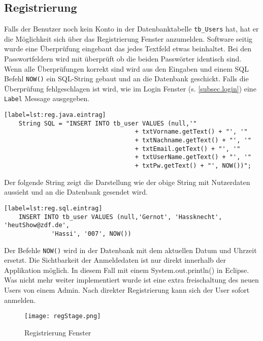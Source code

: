 \subsection{Registrierung}
\label{subsec.registrierung}
Falls der Benutzer noch kein Konto in der Datenbanktabelle \texttt{tb\_Users} hat, hat er die Möglichkeit sich über das Registrierung Fenster anzumelden. Software seitig wurde eine Überprüfung eingebaut das jedes Textfeld etwas beinhaltet. Bei den Passwortfeldern wird mit überprüft ob die beiden Passwörter identisch sind. Wenn alle Überprüfungen korrekt sind wird aus den Eingaben und einem SQL Befehl \texttt{NOW()} ein SQL-String gebaut und an die Datenbank geschickt. Falls die Überprüfung fehlgeschlagen ist wird, wie im  Login Fenster (s. \ref{subsec.login}) eine \texttt{Label} Message ausgegeben.
\begin{lstlisting}[caption={Java-SQL neuer Benutzer},captionpos=b][label=lst:reg.java.eintrag]
	String SQL = "INSERT INTO tb_user VALUES (null,'"
									+ txtVorname.getText() + "', '"
									+ txtNachname.getText() + "', '"
									+ txtEmail.getText() + "', '"
									+ txtUserName.getText() + "', '"
									+ txtPw.getText() + "', NOW())";
\end{lstlisting}
Der folgende String zeigt die Darstellung wie der obige String mit Nutzerdaten aussieht und an die Datenbank gesendet wird.
\begin{lstlisting}[caption={SQL Beispiel String},captionpos=b][label=lst:reg.sql.eintrag]
	INSERT INTO tb_user VALUES (null,'Gernot', 'Hassknecht', 'heutShow@zdf.de',
			 'Hassi', '007', NOW())
\end{lstlisting}

Der Befehle \texttt{NOW()} wird in der Datenbank mit dem aktuellen Datum und Uhrzeit ersetzt.
Die Sichtbarkeit der Anmeldedaten ist nur direkt innerhalb der Applikation möglich. In diesem Fall mit einem System.out.println() in Eclipse. Was nicht mehr weiter implementiert wurde ist eine extra freischaltung des neuen Users von einem Admin. Nach direkter Registrierung kann sich der User sofort anmelden.
\begin{figure}[h]
  \begin{center}
    \texttt{[image: regStage.png]}
  		  \caption{Registrierung Fenster}
     \label{fig.RegistrierungFenster}
  \end{center}
\end{figure}

